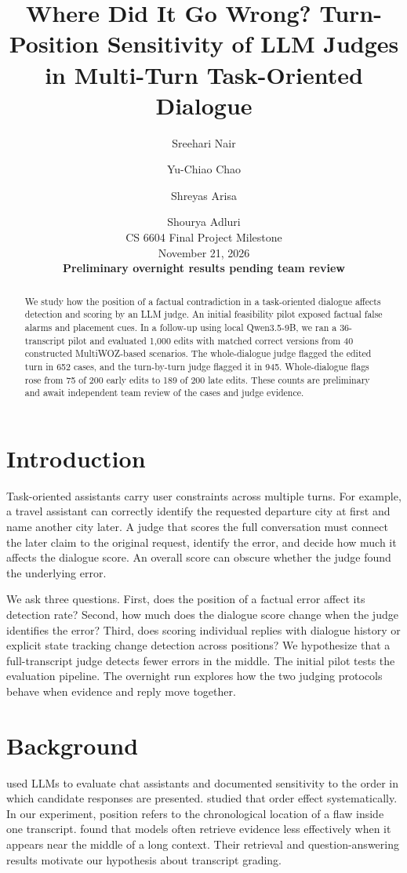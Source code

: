 \documentclass[11pt]{article}
\title{Where Did It Go Wrong? Turn-Position Sensitivity of LLM Judges in Multi-Turn Task-Oriented Dialogue}
\author{Sreehari Nair \and Yu-Chiao Chao \and Shreyas Arisa \and Shourya Adluri \\
  \normalfont CS 6604 Final Project Milestone \\
  \normalfont November 21, 2026 \\
  \normalfont\textbf{Preliminary overnight results pending team review}}
\begin{document}
\maketitle

\begin{abstract}
We study how the position of a factual contradiction in a task-oriented dialogue affects detection and scoring by an LLM judge. An initial feasibility pilot exposed factual false alarms and placement cues. In a follow-up using local Qwen3.5-9B, we ran a 36-transcript pilot and evaluated 1,000 edits with matched correct versions from 40 constructed MultiWOZ-based scenarios. The whole-dialogue judge flagged the edited turn in 652 cases, and the turn-by-turn judge flagged it in 945. Whole-dialogue flags rose from 75 of 200 early edits to 189 of 200 late edits. These counts are preliminary and await independent team review of the cases and judge evidence.
\end{abstract}

\section{Introduction}

Task-oriented assistants carry user constraints across multiple turns. For example, a travel assistant can correctly identify the requested departure city at first and name another city later. A judge that scores the full conversation must connect the later claim to the original request, identify the error, and decide how much it affects the dialogue score. An overall score can obscure whether the judge found the underlying error.

We ask three questions. First, does the position of a factual error affect its detection rate? Second, how much does the dialogue score change when the judge identifies the error? Third, does scoring individual replies with dialogue history or explicit state tracking change detection across positions? We hypothesize that a full-transcript judge detects fewer errors in the middle. The initial pilot tests the evaluation pipeline. The overnight run explores how the two judging protocols behave when evidence and reply move together.

\section{Background}

\citet{zheng2023judge} used LLMs to evaluate chat assistants and documented sensitivity to the order in which candidate responses are presented. \citet{shi2025judging} studied that order effect systematically. In our experiment, position refers to the chronological location of a flaw inside one transcript. \citet{liu2024lost} found that models often retrieve evidence less effectively when it appears near the middle of a long context. Their retrieval and question-answering results motivate our hypothesis about transcript grading.
\end{document}
